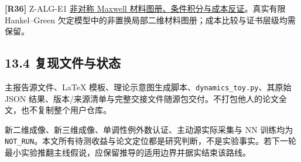 \documentclass[11pt,a4paper]{article}
\begin{document}
\textbf{{[}R36{]}} Z-ALG-E1
\href{https://github.com/migodam/b1-probabilistic-maxwell-imaging/blob/7317601b43b914525c21f09e5a60020552ea677b/research/research_z_alg_asymmetric_validation/RESEARCH_REPORT_ZH.md}{非对称
Maxwell 材料图册、条件积分与成本反证}。真实有限 Hankel--Green
欠定模型中的非置换局部二维材料图册；成本比较与证书层级均需保留。

\hypertarget{ux590dux73b0ux6587ux4ef6ux4e0eux72b6ux6001}{%
\subsection{13.4
复现文件与状态}\label{ux590dux73b0ux6587ux4ef6ux4e0eux72b6ux6001}}

主报告源文件、LaTeX
模板、理论示意图生成脚本、\texttt{dynamics\_toy.py}、其原始 JSON
结果、版本/来源清单与完整交接文件随源包交付。不打包他人的论文全文，也不复制整个用户仓库。

新二维成像、新三维成像、单调性例外数认证、主动源实际采集与 NN 训练均为
\texttt{NOT\_RUN}。本文所有待测收益与论文定位都是研究判断，不是实验事实。若下一轮最小实验推翻主线假说，应保留推导的适用边界并据实结束该路线。
\end{document}
